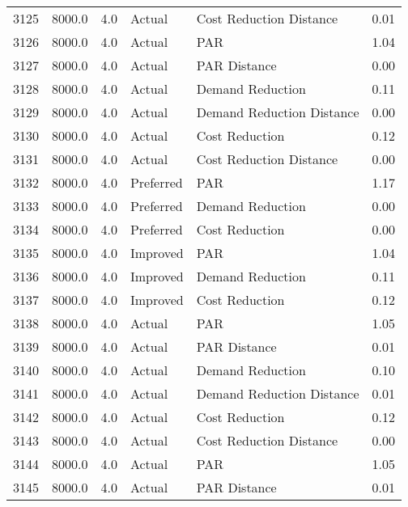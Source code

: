 \begin{longtable}{lrrllr}
3125 &       8000.0 &     4.0 &         Actual &    Cost Reduction Distance &   0.01 \\
3126 &       8000.0 &     4.0 &         Actual &                        PAR &   1.04 \\
3127 &       8000.0 &     4.0 &         Actual &               PAR Distance &   0.00 \\
3128 &       8000.0 &     4.0 &         Actual &           Demand Reduction &   0.11 \\
3129 &       8000.0 &     4.0 &         Actual &  Demand Reduction Distance &   0.00 \\
3130 &       8000.0 &     4.0 &         Actual &             Cost Reduction &   0.12 \\
3131 &       8000.0 &     4.0 &         Actual &    Cost Reduction Distance &   0.00 \\
3132 &       8000.0 &     4.0 &      Preferred &                        PAR &   1.17 \\
3133 &       8000.0 &     4.0 &      Preferred &           Demand Reduction &   0.00 \\
3134 &       8000.0 &     4.0 &      Preferred &             Cost Reduction &   0.00 \\
3135 &       8000.0 &     4.0 &       Improved &                        PAR &   1.04 \\
3136 &       8000.0 &     4.0 &       Improved &           Demand Reduction &   0.11 \\
3137 &       8000.0 &     4.0 &       Improved &             Cost Reduction &   0.12 \\
3138 &       8000.0 &     4.0 &         Actual &                        PAR &   1.05 \\
3139 &       8000.0 &     4.0 &         Actual &               PAR Distance &   0.01 \\
3140 &       8000.0 &     4.0 &         Actual &           Demand Reduction &   0.10 \\
3141 &       8000.0 &     4.0 &         Actual &  Demand Reduction Distance &   0.01 \\
3142 &       8000.0 &     4.0 &         Actual &             Cost Reduction &   0.12 \\
3143 &       8000.0 &     4.0 &         Actual &    Cost Reduction Distance &   0.00 \\
3144 &       8000.0 &     4.0 &         Actual &                        PAR &   1.05 \\
3145 &       8000.0 &     4.0 &         Actual &               PAR Distance &   0.01 \\

\end{longtable}
